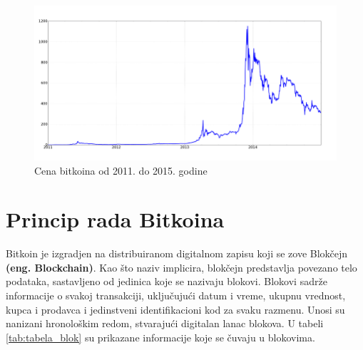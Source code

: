 \documentclass[a4paper]{article}
\begin{document}
\begin{figure}[h!]
	\begin{center}
		\includegraphics[scale=0.4]{chart.png}
	\end{center}
	\caption{Cena bitkoina od 2011. do 2015. godine}
	\label{fig:grafikon}
\end{figure}

\section{Princip rada Bitkoina}
\label{sec:princip_rada}

Bitkoin je izgradjen na distribuiranom digitalnom zapisu koji se zove Blokčejn \textbf{(eng. Blockchain)}. Kao što naziv implicira, blokčejn predstavlja povezano telo podataka, sastavljeno od jedinica koje se nazivaju blokovi. Blokovi sadrže informacije o svakoj transakciji, uključujući datum i vreme, ukupnu vrednost, kupca i prodavca i jedinstveni identifikacioni kod za svaku razmenu. Unosi su nanizani hronološkim redom, stvarajući digitalan lanac blokova.\cite{princip_rada} U tabeli \ref{tab:tabela_blok} su prikazane informacije koje se čuvaju u blokovima.
\\
\end{document}
